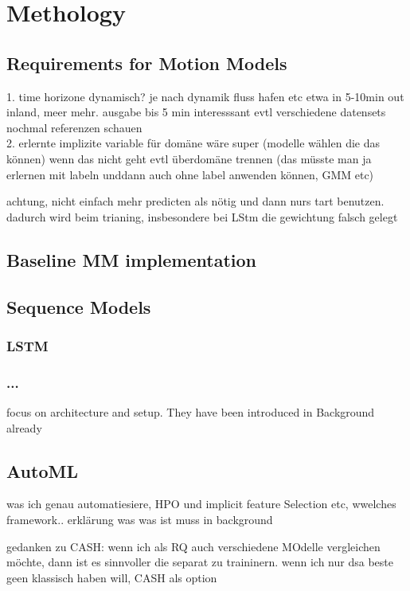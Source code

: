 \chapter{Methology}
\label{chap:methology}
\section{Requirements for Motion Models}
    1. time horizone dynamisch? je nach dynamik fluss hafen etc etwa in 5-10min out inland, meer mehr. ausgabe bis 5 min interesssant
evtl verschiedene datensets nochmal referenzen schauen\\

    2. erlernte implizite variable für domäne wäre super (modelle wählen die das können)
    wenn das nicht geht evtl überdomäne trennen (das müsste man ja erlernen mit labeln unddann auch ohne label anwenden können, GMM etc)

    achtung, nicht einfach mehr predicten als nötig und dann nurs tart benutzen. dadurch wird beim trianing, insbesondere bei LStm die gewichtung falsch gelegt
\section{Baseline MM implementation}

\section{Sequence Models}%
    
    \subsection{LSTM}
    \subsection{...}

    focus on architecture and setup. They have been introduced in Background already
\section{AutoML}
    was ich genau automatiesiere, HPO und implicit feature Selection etc, wwelches framework.. erklärung was was ist muss in background

    gedanken zu CASH: wenn ich als RQ auch verschiedene MOdelle vergleichen möchte, dann ist es sinnvoller die separat zu traininern. wenn ich nur dsa beste geen klassisch haben will, CASH als option
    

